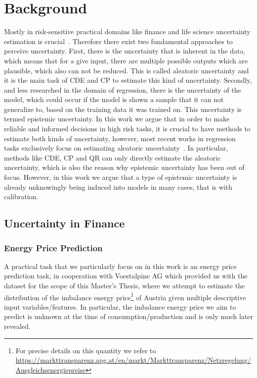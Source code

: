 \section{Background}\label{sec:background}

Mostly in risk-sensitive practical domains like finance and life science uncertainty estimation is crucial~\cite{abdar2021review, xia2020uncertainty, ghesu2021quantifying, mashrur2020machine}. Therefore there exist two fundamental approaches to perceive uncertainty. First, there is the uncertainty that is inherent in the data, which means that for a give input, there are multiple possible outputs which are plausible, which also can not be reduced. This is called aleatoric uncertainty and it is the main task of CDE and CP to estimate this kind of uncertainty. Secondly, and less researched in the domain of regression, there is the uncertainty of the model, which could occur if the model is shown a sample that it can not generalize to, based on the training data it was trained on. This uncertainty is termed epistemic uncertainty. In this work we argue that in order to make reliable and informed decisions in high risk tasks, it is crucial to have methods to estimate both kinds of uncertainty, however, most recent works in regression tasks exclusively focus on estimating aleatoric uncertainty~\cite{romano2019conformalized, sesia2020comparison, angelopoulos2021gentle,chernozhukov2021distributional,sesia2021conformal, oliveira2022split, romano2022conformal, izbicki2022cd, gupta2022nested, auer2024conformal}. In particular, methods like CDE, CP and QR can only directly estimate the aleatoric uncertainty, which is also the reason why epistemic uncertainty has been out of focus. However, in this work we argue that a type of epistemic uncertainty is already unknowingly being induced into models in many cases, that is with calibration.

\subsection{Uncertainty in Finance}\label{sec:intro_finance}

\subsubsection{Energy Price Prediction}

A practical task that we particularly focus on in this work is an energy price prediction task, in cooperation with Voestalpine AG which provided us with the dataset for the scope of this Master's Thesis, where we attempt to estimate the distribution of the imbalance energy price\footnote{For precise details on this quantity we refer to \url{https://markttransparenz.apg.at/en/markt/Markttransparenz/Netzregelung/Ausgleichsenergiepreise}} of Austria given multiple descriptive input variables/features. In particular, the imbalance energy price we aim to predict is unknown at the time of consumption/production and is only much later revealed.

